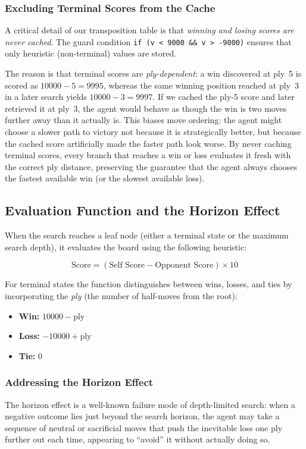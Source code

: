 \documentclass[12pt,a4paper]{article}
\begin{document}
\subsubsection{Excluding Terminal Scores from the Cache}
A critical detail of our transposition table is that \emph{winning and losing scores are never cached}. The guard condition \texttt{if (v < 9000 \&\& v > -9000)} ensures that only heuristic (non-terminal) values are stored.

The reason is that terminal scores are \textit{ply-dependent}: a win discovered at ply~5 is scored as $10000 - 5 = 9995$, whereas the same winning position reached at ply~3 in a later search yields $10000 - 3 = 9997$. If we cached the ply-5 score and later retrieved it at ply~3, the agent would behave as though the win is two moves further away than it actually is. This biases move ordering: the agent might choose a slower path to victory not because it is strategically better, but because the cached score artificially made the faster path look worse. By never caching terminal scores, every branch that reaches a win or loss evaluates it fresh with the correct ply distance, preserving the guarantee that the agent always chooses the fastest available win (or the slowest available loss).

\subsection{Evaluation Function and the Horizon Effect}
\label{sec:eval}
When the search reaches a leaf node (either a terminal state or the maximum search depth), it evaluates the board using the following heuristic:

\[ \text{Score} = (\text{Self Score} - \text{Opponent Score}) \times 10 \]

For terminal states the function distinguishes between wins, losses, and ties by incorporating the \textit{ply} (the number of half-moves from the root):
\begin{itemize}
    \item \textbf{Win:} $10000 - \text{ply}$
    \item \textbf{Loss:} $-10000 + \text{ply}$
    \item \textbf{Tie:} $0$
\end{itemize}

\subsubsection{Addressing the Horizon Effect}
The horizon effect is a well-known failure mode of depth-limited search: when a negative outcome lies just beyond the search horizon, the agent may take a sequence of neutral or sacrificial moves that push the inevitable loss one ply further out each time, appearing to ``avoid'' it without actually doing so.
\end{document}
